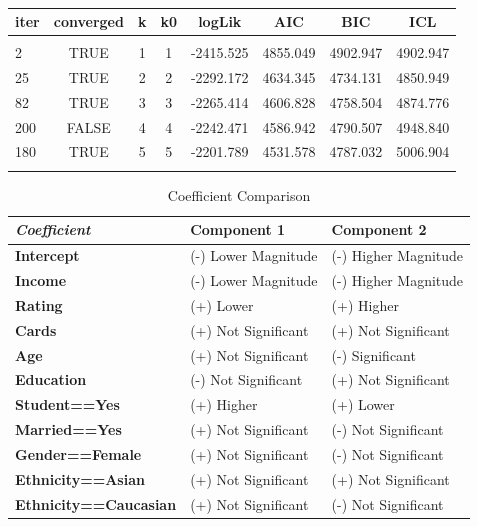 \documentclass[12pt]{article}
\begin{document}
{\begin{table}[H] \centering 
  \caption{} 
  \label{} 
\begin{tabular}{@{\extracolsep{5pt}}lccccccc} 
\hline \hline
iter & converged &k& k0   & logLik   &   AIC    &  BIC  &    ICL\\
\hline \\ 
    2   &   TRUE& 1 & 1& -2415.525& 4855.049& 4902.947& 4902.947\\
   25   &   TRUE& 2 & 2& -2292.172& 4634.345& 4734.131& 4850.949\\
   82   &   TRUE& 3 & 3& -2265.414& 4606.828& 4758.504& 4874.776\\
  200   &  FALSE& 4 & 4& -2242.471& 4586.942& 4790.507& 4948.840\\
  180   &   TRUE& 5 & 5& -2201.789& 4531.578& 4787.032& 5006.904\\
\hline 
\hline \\[-1.8ex] 
\end{tabular} 
\end{table} 

\begin{table}[H] \centering 
  \caption{Coefficient Comparison} 
  \label{} 
\begin{tabular}{l|ll}
\hline
\textit{\textbf{Coefficient}} & \textbf{Component 1} & \textbf{Component 2} \\
\hline
\textbf{Intercept} & (-) Lower Magnitude & (-) Higher Magnitude \\
\textbf{Income} & (-) Lower Magnitude & (-) Higher Magnitude \\
\textbf{Rating} & (+) Lower & (+) Higher \\
\textbf{Cards} & (+) Not Significant & (+) Not Significant \\
\textbf{Age} & (+) Not Significant & (-) Significant \\
\textbf{Education} & (-) Not Significant & (+) Not Significant \\
\textbf{Student==Yes} & (+) Higher & (+) Lower \\
\textbf{Married==Yes} & (+) Not Significant & (-) Not Significant \\
\textbf{Gender==Female} & (+) Not Significant & (-) Not Significant \\
\textbf{Ethnicity==Asian} & (+) Not Significant & (+) Not Significant \\
\textbf{Ethnicity==Caucasian} & (+) Not Significant & (-) Not Significant
\end{tabular}
\end{table}

}
\end{document}
